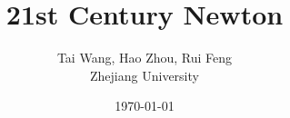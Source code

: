 \documentclass[a4paper,12pt]{article}%
\title{21st Century Newton}
\author{Tai Wang, Hao Zhou, Rui Feng \\ \small Zhejiang University}
\date{\today}
\theoremstyle{definition}
\begin{document}
\maketitle
                                              
\newpage                                                          
\tableofcontents                                                  
\newpage                                                          






\balance


\end{document}
